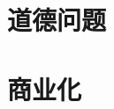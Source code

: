 \documentclass[12pt,a4paper]{report}
\newcommand{\cc}[2]{#1}
\newcommand{\cc}[2]{#2}
\theoremstyle{examples} \newtheorem{example}{Example}[section]
\begin{document}
	\section{\cc{道德问题}{Ethical issues}}
	
	\section{\cc{商业化}{Business aspects}}


%
%
%
%
%
%
%
%
%
%
%
%
%
%
%
%
%
%
%
%
%

%
\end{document}
